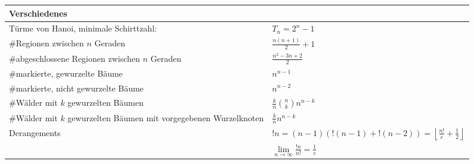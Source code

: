 \begin{tabularx}{\linewidth}{|ll|}
	\hline
	\multicolumn{2}{|C|}{Verschiedenes} \\
	\hline
	Türme von Hanoi, minimale Schirttzahl: &
	$T_n = 2^n - 1$ \\

	\#Regionen zwischen $n$ Geraden	&
	$\frac{n\left(n + 1\right)}{2} + 1$ \\

	\#abgeschlossene Regionen zwischen $n$ Geraden &
	$\frac{n^2 - 3n + 2}{2}$ \\

	\#markierte, gewurzelte Bäume	&
	$n^{n-1}$ \\

	\#markierte, nicht gewurzelte Bäume	&
	$n^{n-2}$ \\

	\#Wälder mit $k$ gewurzelten Bäumen	&
	$\frac{k}{n}\binom{n}{k}n^{n-k}$ \\

	\#Wälder mit $k$ gewurzelten Bäumen mit vorgegebenen Wurzelknoten&
	$\frac{k}{n}n^{n-k}$ \\

	Derangements &
	$!n = (n - 1)(!(n - 1) + !(n - 2)) = \left\lfloor\frac{n!}{e} + \frac{1}{2}\right\rfloor$ \\
	&
	$\lim\limits_{n \to \infty} \frac{!n}{n!} = \frac{1}{e}$ \\
	\hline
\end{tabularx}

